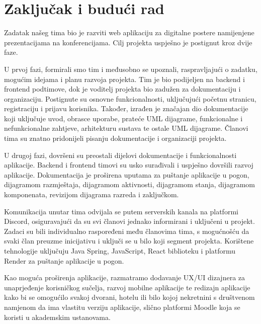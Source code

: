 \chapter{Zaključak i budući rad}
		 
		 Zadatak našeg tima bio je razviti web aplikaciju za digitalne postere namijenjene prezentacijama na konferencijama. Cilj projekta uspješno je postignut kroz dvije faze.
		 
		 U prvoj fazi, formirali smo tim i međusobno se upoznali, raspravljajući o zadatku, mogućim idejama i planu razvoja projekta. Tim je bio podijeljen na backend i frontend podtimove, dok je voditelj projekta bio zadužen za dokumentaciju i organizaciju. Postignute su osnovne funkcionalnosti, uključujući početnu stranicu, registraciju i prijavu korisnika. Također, izrađen je značajan dio dokumentacije koji uključuje uvod, obrasce uporabe, prateće UML dijagrame, funkcionalne i nefunkcionalne zahtjeve, arhitekturu sustava te ostale UML dijagrame. Članovi tima su znatno pridonijeli pisanju dokumentacije i organizaciji projekta.
		 
		 U drugoj fazi, dovršeni su preostali dijelovi dokumentacije i funkcionalnosti aplikacije. Backend i frontend timovi su usko surađivali i uspješno dovršili razvoj aplikacije. Dokumentacija je proširena uputama za puštanje aplikacije u pogon, dijagramom razmještaja, dijagramom aktivnosti, dijagramom stanja, dijagramom komponenata, revizijom dijagrama razreda i zaključkom.
		 
		 Komunikacija unutar tima odvijala se putem serverskih kanala na platformi Discord, osiguravajući da su svi članovi jednako informirani i uključeni u projekt. Zadaci su bili individualno raspoređeni među članovima tima, s mogućnošću da svaki član preuzme inicijativu i uključi se u bilo koji segment projekta. Korištene tehnologije uključuju Java Spring, JavaScript, React biblioteku i platformu Render za puštanje aplikacije u pogon.
		 
		 Kao moguća proširenja aplikacije, razmatramo dodavanje UX/UI dizajnera za unaprjeđenje korisničkog sučelja, razvoj mobilne aplikacije te redizajn aplikacije kako bi se omogućilo svakoj dvorani, hotelu ili bilo kojoj nekretnini s društvenom namjenom da ima vlastitu verziju aplikacije, slično platformi Moodle koja se koristi u akademskim ustanovama.
		
		\eject 